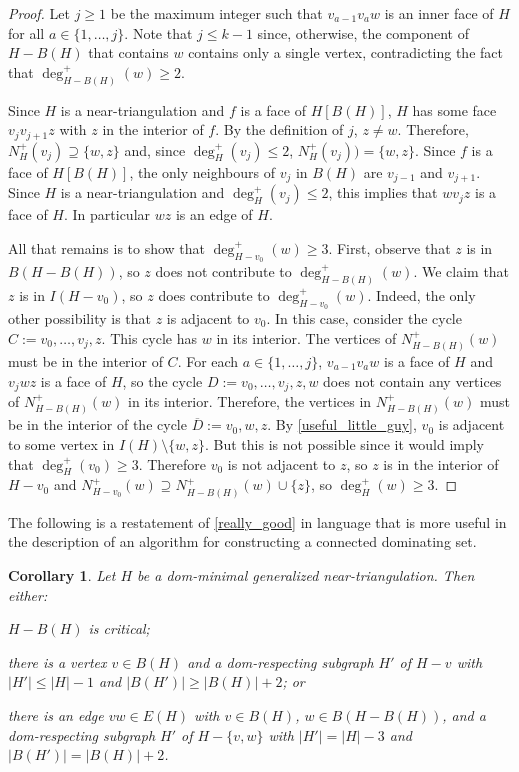\documentclass{article}
\newtheorem{cor}{Corollary}
\theoremstyle{definition}
\begin{document}
\begin{proof}
  Let $j\ge 1$ be the maximum integer such that $v_{a-1}v_{a}w$ is an inner face of $H$ for all $a\in\{1,\ldots,j\}$.  Note that $j\le k-1$ since, otherwise, the component of $H-B(H)$ that contains $w$ contains only a single vertex, contradicting the fact that $\deg^+_{H-B(H)}(w)\ge 2$.

  Since $H$ is a near-triangulation and $f$ is a face of $H[B(H)]$, $H$ has some face $v_j v_{j+1} z$ with $z$ in the interior of $f$.  By the definition of $j$, $z\neq w$.  Therefore, $N_H^+(v_j)\supseteq \{w,z\}$ and, since $\deg^+_H(v_j)\le 2$, $N_H^+(v_j))= \{w,z\}$.
  Since $f$ is a face of $H[B(H)]$, the only neighbours of $v_j$ in $B(H)$ are $v_{j-1}$ and $v_{j+1}$. Since $H$ is a near-triangulation and $\deg^+_H(v_j)\le 2$, this implies that $w v_j z$ is a face of $H$.  In particular $wz$ is an edge of $H$.

  All that remains is to show that $\deg^+_{H-v_0}(w)\ge 3$.  First, observe that $z$ is in $B(H-B(H))$, so $z$ does not contribute to $\deg^+_{H-B(H)}(w)$. We claim that $z$ is in $I(H-v_0)$, so $z$ does contribute to $\deg^+_{H-v_0}(w)$.   Indeed, the only other possibility is that $z$ is adjacent to $v_0$.  In this case, consider the cycle $C:=v_0,\ldots,v_j,z$.  This cycle has $w$ in its interior. The vertices of $N^+_{H-B(H)}(w)$ must be in the interior of $C$. For each $a\in\{1,\ldots,j\}$, $v_{a-1}v_a w$ is a face of $H$ and $v_jwz$ is a face of $H$, so the cycle $D:=v_0,\ldots,v_j,z,w$ does not contain any vertices of $N^+_{H-B(H)}(w)$ in its interior.  Therefore, the vertices in $N^+_{H-B(H)}(w)$ must be in the interior of the cycle $\overline{D}:=v_0,w,z$.  By \cref{useful_little_guy}, $v_0$ is adjacent to some vertex in $I(H)\setminus\{w,z\}$. But this is not possible since it would imply that $\deg^+_H(v_0)\ge 3$.  Therefore $v_0$ is not adjacent to $z$, so $z$ is in the interior of $H-v_0$ and $N^+_{H-v_0}(w)\supseteq N^+_{H-B(H)}(w)\cup\{z\}$, so $\deg^+_H(w)\ge 3$.
\end{proof}


The following is a restatement of \cref{really_good} in language that is more useful in the description of an algorithm for constructing a connected dominating set.

\begin{cor}\label{really_good_cor}
  Let $H$ be a dom-minimal generalized near-triangulation.  Then either:
  \begin{compactenum}[(1)]
    \item $H-B(H)$ is critical;
    \item there is a vertex $v\in B(H)$ and a dom-respecting subgraph $H'$ of  $H-v$ with $|H'|\le |H|-1$ and $|B(H')|\ge |B(H)|+2$; or
    \item there is an edge $vw\in E(H)$ with $v\in B(H)$, $w\in B(H-B(H))$, and a dom-respecting subgraph $H'$ of $H-\{v,w\}$ with $|H'|= |H|-3$ and $|B(H')|=|B(H)|+2$.
  \end{compactenum}
\end{cor}
\end{document}
